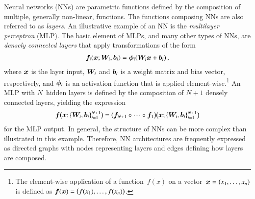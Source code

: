 Neural networks (NNs) are parametric functions defined by the composition of
multiple, generally non-linear, functions. The functions composing NNs are also
referred to as \emph{layers}. An illustrative example of an NN is the
\emph{multilayer perceptron} (MLP). The basic element of MLPs, and many other
types of NNs, are \emph{densely connected layers} that apply transformations of
the form
\begin{align*}
  \bm{f}_i(\bm{x}; \bm{W}_i, \bm{b}_i) = \bm{\phi}_i(\bm{W}_i \bm{x} + \bm{b}_i) \,\text{,}
\end{align*}
where $\bm{x}$ is the layer input, $\bm{W}_i$ and $\bm{b}_i$ is a
weight matrix and bias vector, respectively, and $\bm{\phi}_i$ is an
activation function that is applied element-wise.\footnote{The element-wise
  application of a function~$f(x)$ on a vector~$\bm{x} = (x_1, \dots, x_n)$
  is defined as $\bm{f}(\bm{x}) = \bigl( f(x_1), \dots, f(x_n) \bigr)$.}
An MLP with $N$~hidden layers is defined by the composition of $N + 1$ densely
connected layers, yielding the expression
\begin{align*}
  \bm{f}\bigl( \bm{x}; \{\bm{W}_{i},\bm{b}_{i} \}_{i=1}^{N+1} \bigr)
  = \bigl( \bm{f}_{N+1} \circ \dots \circ \bm{f}_{1} \bigr)
  \bigl( \bm{x}; \{\bm{W}_i, \bm{b}_i\}_{i=1}^{N+1} \bigr)
\end{align*}
for the MLP output. In general, the structure of NNs can be more complex than
illustrated in this example. Therefore, NN architectures are frequently
expressed as directed graphs with nodes representing layers and edges defining
how layers are composed.


